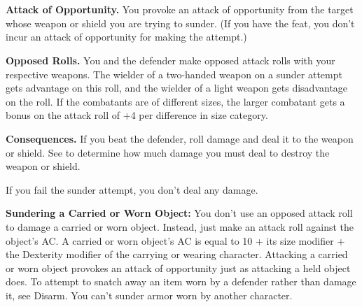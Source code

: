 {\\
\\
}

\begin{enumerate*}
\item \textbf{Attack of Opportunity.} You provoke an attack of opportunity from the target whose weapon or shield you are trying to sunder. (If you have the  feat, you don't incur an attack of opportunity for making the attempt.)

\item \textbf{Opposed Rolls.} You and the defender make opposed attack rolls with your respective weapons. The wielder of a two-handed weapon on a sunder attempt gets advantage on this roll, and the wielder of a light weapon gets disadvantage on the roll. If the combatants are of different sizes, the larger combatant gets a bonus on the attack roll of +4 per difference in size category.

\item \textbf{Consequences.} If you beat the defender, roll damage and deal it to the weapon or shield. See  to determine how much damage you must deal to destroy the weapon or shield.
\end{enumerate*}

If you fail the sunder attempt, you don't deal any damage.

\textbf{Sundering a Carried or Worn Object:} You don't use an opposed attack roll to damage a carried or worn object. Instead, just make an attack roll against the object's AC. A carried or worn object's AC is equal to 10 + its size modifier + the Dexterity modifier of the carrying or wearing character. Attacking a carried or worn object provokes an attack of opportunity just as attacking a held object does. To attempt to snatch away an item worn by a defender rather than damage it, see Disarm. You can't sunder armor worn by another character.